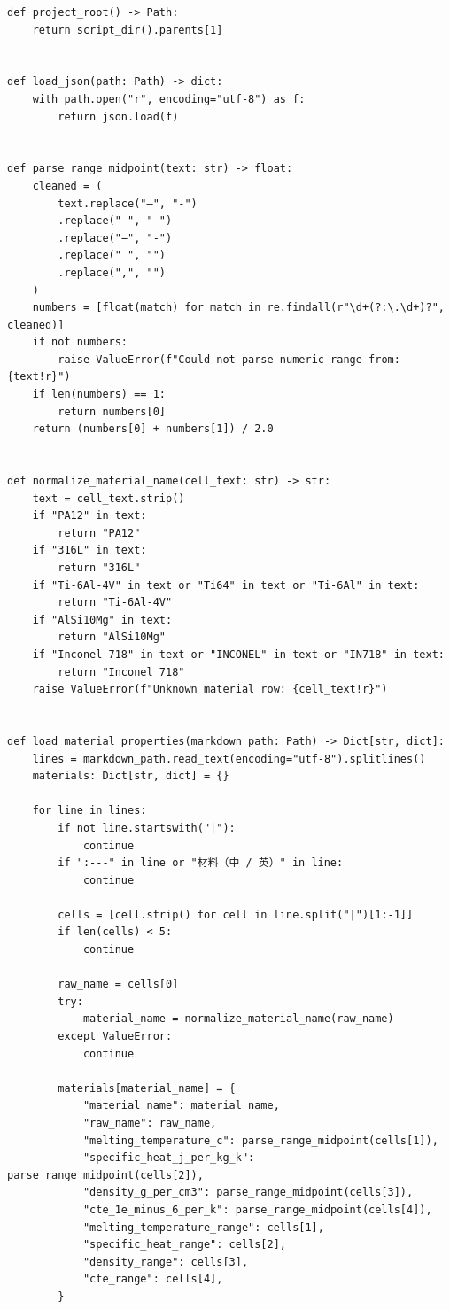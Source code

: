 \documentclass[a4paper, 12pt]{ctexart}
\begin{document}
\begin{verbatim}
def project_root() -> Path:
    return script_dir().parents[1]


def load_json(path: Path) -> dict:
    with path.open("r", encoding="utf-8") as f:
        return json.load(f)


def parse_range_midpoint(text: str) -> float:
    cleaned = (
        text.replace("–", "-")
        .replace("—", "-")
        .replace("−", "-")
        .replace(" ", "")
        .replace(",", "")
    )
    numbers = [float(match) for match in re.findall(r"\d+(?:\.\d+)?", cleaned)]
    if not numbers:
        raise ValueError(f"Could not parse numeric range from: {text!r}")
    if len(numbers) == 1:
        return numbers[0]
    return (numbers[0] + numbers[1]) / 2.0


def normalize_material_name(cell_text: str) -> str:
    text = cell_text.strip()
    if "PA12" in text:
        return "PA12"
    if "316L" in text:
        return "316L"
    if "Ti-6Al-4V" in text or "Ti64" in text or "Ti-6Al" in text:
        return "Ti-6Al-4V"
    if "AlSi10Mg" in text:
        return "AlSi10Mg"
    if "Inconel 718" in text or "INCONEL" in text or "IN718" in text:
        return "Inconel 718"
    raise ValueError(f"Unknown material row: {cell_text!r}")


def load_material_properties(markdown_path: Path) -> Dict[str, dict]:
    lines = markdown_path.read_text(encoding="utf-8").splitlines()
    materials: Dict[str, dict] = {}

    for line in lines:
        if not line.startswith("|"):
            continue
        if ":---" in line or "材料（中 / 英）" in line:
            continue

        cells = [cell.strip() for cell in line.split("|")[1:-1]]
        if len(cells) < 5:
            continue

        raw_name = cells[0]
        try:
            material_name = normalize_material_name(raw_name)
        except ValueError:
            continue

        materials[material_name] = {
            "material_name": material_name,
            "raw_name": raw_name,
            "melting_temperature_c": parse_range_midpoint(cells[1]),
            "specific_heat_j_per_kg_k": parse_range_midpoint(cells[2]),
            "density_g_per_cm3": parse_range_midpoint(cells[3]),
            "cte_1e_minus_6_per_k": parse_range_midpoint(cells[4]),
            "melting_temperature_range": cells[1],
            "specific_heat_range": cells[2],
            "density_range": cells[3],
            "cte_range": cells[4],
        }


\end{verbatim}
\end{document}
